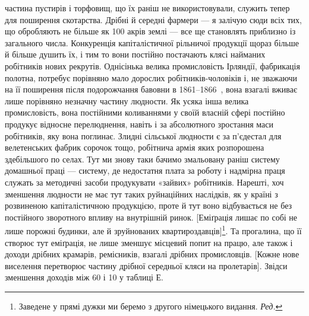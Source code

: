 \parcont{}  %
частина пустирів і торфовищ, що їх раніш не використовували,
служить тепер для поширення скотарства. Дрібні й середні
фармери — я залічую сюди всіх тих, що обробляють не більше
як 100 акрів землі — все ще становлять приблизно  із загального
числа.  Конкуренція капіталістичної рільничої продукції
щораз більше й більше душить їх, і тим то вони постійно постачають
клясі найманих робітників нових рекрутів. Однісінька
велика промисловість Ірляндії, фабрикація полотна, потребує
порівняно мало дорослих робітників-чоловіків і, не зважаючи
на її поширення після подорожчання бавовни в 1861--1866~,
вона взагалі вживає лише порівняно незначну частину людности.
Як усяка інша велика промисловість, вона постійними коливаннями
у своїй власній сфері постійно продукує відносне перелюднення,
навіть і за абсолютного зростання маси робітників, яку
вона поглинає. Злидні сільської людности є за п’єдестал для велетенських
фабрик сорочок тощо, робітнича армія яких розпорошена
здебільшого по селах. Тут ми знову таки бачимо змальовану
раніш систему домашньої праці — систему, де недостатня
плата за роботу і надмірна праця служать за методичні засоби
продукувати «зайвих» робітників. Нарешті, хоч зменшення людности
не має тут таких руйнаційних наслідків, як у країні з розвиненою
капіталістичною продукцією, проте й тут воно відбувається
не без постійного зворотного впливу на внутрішній ринок.
[Еміґрація лишає по собі не лише порожні будинки, але й зруйнованих
квартироздавців]\footnote*{Заведене у прямі дужки ми беремо з другого німецького видання. \emph{Ред.}}. Та прогалина, що її створює тут
еміґрація, не лише зменшує місцевий попит на працю, але також
і доходи дрібних крамарів, ремісників, взагалі дрібних промисловців.
[Кожне нове виселення перетворює частину дрібної середньої
кляси на пролетарів]\footnotemarkZ[\value{footnoteZ}]. Звідси зменшення доходів між
60 і 10 у таблиці Е.


